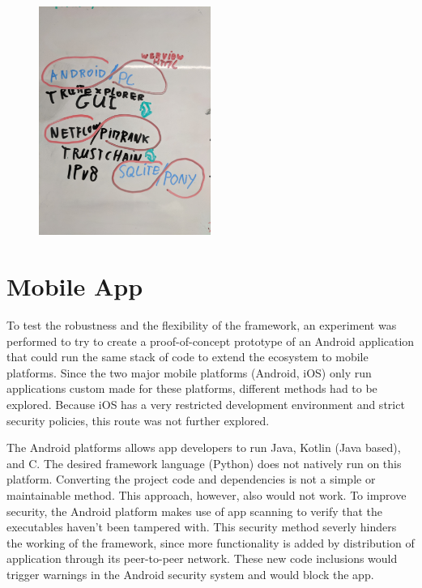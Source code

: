\begin{figure}[h]
	\centering
	\includegraphics[width=0.5\textwidth]{images/experiment.jpg}
	\caption{\label{fig:experiment}}
\end{figure}

\section{Mobile App}

To test the robustness and the flexibility of the framework, an experiment was performed to try to create a proof-of-concept prototype of an Android application that could run the same stack of code to extend the ecosystem to mobile platforms. Since the two major mobile platforms (Android, iOS) only run applications custom made for these platforms, different methods had to be explored. Because iOS has a very restricted development environment and strict security policies, this route was not further explored.

The Android platforms allows app developers to run Java, Kotlin (Java based), and C. The desired framework language (Python) does not natively run on this platform. Converting the project code and dependencies is not a simple or maintainable method. This approach, however, also would not work. To improve security, the Android platform makes use of app scanning to verify that the executables haven't been tampered with. This security method severly hinders the working of the framework, since more functionality is added by distribution of application through its peer-to-peer network. These new code inclusions would trigger warnings in the Android security system and would block the app.

